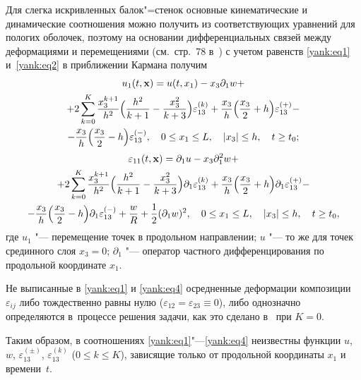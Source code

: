 Для слегка искривленных балок"=стенок основные кинематические и динамические
соотношения можно получить из соответствующих уравнений для пологих
оболочек, поэтому на основании дифференциальных связей между деформациями и
перемещениями (см.~стр.~78 в~\cite{yank:bib18}) с учетом равенств \eqref{yank:eq1} и~\eqref{yank:eq2} в приближении
Кармана получим
\begin{multline}
\label{yank:eq3}
u_1 (t,{\bf x})=u (t,x_1 )-x_3
\partial _1 w+ 
\\
+ 2\sum\limits_{k=0}^K \frac{x_3^{k+1}}{h^2} 
\Bigl( \frac{h^2}{k+1}-\frac{x_3^2 }{k+3} \Bigr)\varepsilon _{13}^{(k)} + 
\frac{x_3 }{h}\Bigl(\frac{x_3 }{2}+h \Bigr)\varepsilon _{13}^{(+)} -
\\
-\frac{x_3}{h}\Bigl( \frac{x_3 }{2}-h \Bigr)\varepsilon _{13}^{(-)},\quad 0\le x_1 \le L,\quad | x_3 |\le
h,\quad t\ge t_0;
\end{multline}
\begin{multline}
\label{yank:eq4}
\varepsilon_{11} (t,{\bf x})=\partial _1 u-x_3 \partial _1^2 w+ 
\\
+2\sum\limits_{k=0}^K \frac{x_3^{k+1}}{h^2} 
\Bigl( \frac{h^2}{k+1}-\frac{x_3^2 }{k+3}\Bigr)\partial _1 \varepsilon _{13}^{(k)} +
\frac{x_3}{h}\Bigl(\frac{x_3 }{2}+h \Bigr)\partial _1 \varepsilon _{13}^{(+)} - 
\\
 -\frac{x_3 }{h}\Bigl( \frac{x_3 }{2}-h \Bigr)\partial _1 \varepsilon _{13}^{(-)} +\frac{w}{R}+\frac{1}{2} (\partial _1 w )^2,\quad 0\le x_1 \le L,\quad |x_3|\le h,\quad t\ge t_0,
\end{multline}
где $u_1$  "---  перемещение точек в продольном направлении; $u$  "---  то же для
точек срединного слоя $x_3 =0$; $\partial _1$  "---  оператор частного
дифференцирования по продольной координате $x_1$.

Не выписанные в \eqref{yank:eq1} и \eqref{yank:eq4} осредненные деформации композиции $\varepsilon
_{ij} $ либо тождественно равны нулю ($\varepsilon _{12} =\varepsilon _{23}
\equiv 0$), либо однозначно определяются в~процессе решения задачи, как это
сделано в~\cite{yank:bib13} при $K=0$.

Таким образом, в соотношениях \eqref{yank:eq1}"---\eqref{yank:eq4} неизвестны функции $u$, $w$, $\varepsilon
_{13}^{(\pm )}$, $\varepsilon _{13}^{(k)} $ ($0\le k\le K$), зависящие
только от продольной координаты $x_1$ и времени~$t$.

